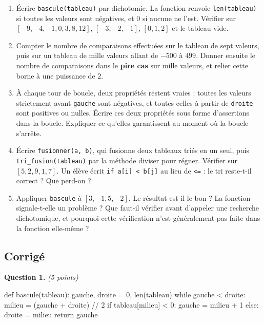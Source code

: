 \begin{enumerate}
  \item Écrire \lstinline{bascule(tableau)} par dichotomie. La fonction renvoie
    \lstinline{len(tableau)} si toutes les valeurs sont négatives, et $0$ si
    aucune ne l'est. Vérifier sur $[-9, -4, -1, 0, 3, 8, 12]$,
    $[-3, -2, -1]$, $[0, 1, 2]$ et le tableau vide.

  \item Compter le nombre de comparaisons effectuées sur le tableau de sept
    valeurs, puis sur un tableau de mille valeurs allant de $-500$ à $499$.
    Donner ensuite le nombre de comparaisons dans le \textbf{pire cas} sur
    mille valeurs, et relier cette borne à une puissance de $2$.

  \item À chaque tour de boucle, deux propriétés restent vraies : toutes les
    valeurs strictement avant \lstinline{gauche} sont négatives, et toutes
    celles à partir de \lstinline{droite} sont positives ou nulles. Écrire ces
    deux propriétés sous forme d'assertions dans la boucle. Expliquer ce
    qu'elles garantissent au moment où la boucle s'arrête.

  \item Écrire \lstinline{fusionner(a, b)}, qui fusionne deux tableaux triés en
    un seul, puis \lstinline{tri_fusion(tableau)} par la méthode diviser pour
    régner. Vérifier sur $[5, 2, 9, 1, 7]$. Un élève écrit
    \lstinline{if a[i] < b[j]} au lieu de \lstinline{<=} : le tri reste-t-il
    correct ? Que perd-on ?

  \item Appliquer \lstinline{bascule} à $[3, -1, 5, -2]$. Le résultat est-il le
    bon ? La fonction signale-t-elle un problème ? Que faut-il vérifier avant
    d'appeler une recherche dichotomique, et pourquoi cette vérification n'est
    généralement pas faite dans la fonction elle-même ?
\end{enumerate}

\subsection*{Corrigé}

\textbf{Question 1.} \emph{(5 points)}

\begin{python}
def bascule(tableau):
    gauche, droite = 0, len(tableau)
    while gauche < droite:
        milieu = (gauche + droite) // 2
        if tableau[milieu] < 0:
            gauche = milieu + 1
        else:
            droite = milieu
    return gauche
\end{python}

